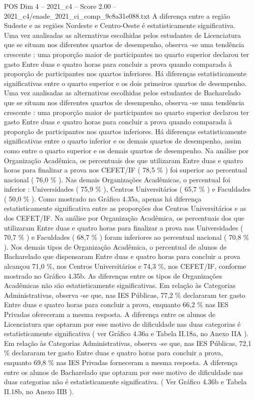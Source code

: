 \begin{textsample}{POS Dim 4 – 2021\_c4 – Score 2.00 – 2021\_c4/enade\_2021\_ci\_comp\_9c8a31e088.txt}
A diferença entre a região Sudeste e as regiões Nordeste e Centro-Oeste é estatisticamente significativa.
Uma vez analisadas as alternativas escolhidas pelos estudantes de Licenciatura que se situam nos diferentes quartos de desempenho, observa -se uma tendência crescente : uma proporção maior de participantes no quarto superior declarou ter gasto Entre duas e quatro horas para concluir a prova quando comparada à proporção de participantes nos quartos inferiores.
Há diferenças estatisticamente significativas entre o quarto superior e os dois primeiros quartos de desempenho.
Uma vez analisadas as alternativas escolhidas pelos estudantes de Bacharelado que se situam nos diferentes quartos de desempenho, observa -se uma tendência crescente : uma proporção maior de participantes no quarto superior declarou ter gasto Entre duas e quatro horas para concluir a prova quando comparada à proporção de participantes nos quartos inferiores.
Há diferenças estatisticamente significativas entre o quarto inferior e os demais quartos de desempenho, assim como entre o quarto superior e os demais quartos de desempenho.
Na análise por Organização Acadêmica, os percentuais dos que utilizaram Entre duas e quatro horas para finalizar a prova nos CEFET/IF ( 78,5 \% ) foi superior ao percentual nacional ( 76,0 \% ).
Nas demais Organizações Acadêmicas, o percentual foi inferior : Universidades ( 75,9 \% ), Centros Universitários ( 65,7 \% ) e Faculdades ( 50,0 \% ).
Como mostrado no Gráfico 4.35a, apenas há diferença estatisticamente significativa entre as proporções dos Centros Universitários e as dos CEFET/IF.
Na análise por Organização Acadêmica, os percentuais dos que utilizaram Entre duas e quatro horas para finalizar a prova nas Universidades ( 70,7 \% ) e Faculdades ( 68,7 \% ) foram inferiores ao percentual nacional ( 70,8 \% ).
Nos demais tipos de Organização Acadêmica, o percentual de alunos de Bacharelado que dispensaram Entre duas e quatro horas para concluir a prova alcançou 71,0 \%, nos Centros Universitários e 74,3 \%, nos CEFET/IF, conforme mostrado no Gráfico 4.35b.
As diferenças entre os tipos de Organizações Acadêmicas não são estatisticamente significativas.
Em relação às Categorias Administrativas, observa -se que, nas IES Públicas, 77,2 \% declararam ter gasto Entre duas e quatro horas para concluir a prova, enquanto 66,2 \% nas IES Privadas ofereceram a mesma resposta.
A diferença entre os alunos de Licenciatura que optaram por esse motivo de dificuldade nas duas categorias é estatisticamente significativa ( ver Gráfico 4.36a e Tabela II.18a, no Anexo IIA ).
Em relação às Categorias Administrativas, observa -se que, nas IES Públicas, 72,1 \% declararam ter gasto Entre duas e quatro horas para concluir a prova, enquanto 69,8 \% nas IES Privadas forneceram a mesma resposta.
A diferença entre os alunos de Bacharelado que optaram por esse motivo de dificuldade nas duas categorias não é estatisticamente significativa. ( Ver Gráfico 4.36b e Tabela II.18b, no Anexo IIB ).

\end{textsample}
